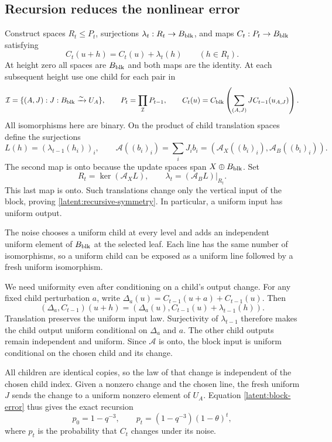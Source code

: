 \documentclass[11pt]{article}
\begin{document}
\subsection{Recursion reduces the nonlinear error}

Construct spaces $R_t\le P_t$, surjections $\lambda_t:R_t\to B_{\rm blk}$, and
maps $C_t:P_t\to B_{\rm blk}$ satisfying
\begin{equation}
 C_t(u+h)=C_t(u)+\lambda_t(h)\qquad(h\in R_t).
 \label{latent:recursive-symmetry}
\end{equation}
At height zero all spaces are $B_{\rm blk}$ and both maps are the identity.
At each subsequent height use one child for each pair in
\[
 \mathcal I=\{(A,J):J:B_{\rm blk}\xrightarrow{\sim}U_A\},
 \qquad
 P_t=\prod_{\mathcal I}P_{t-1},
 \qquad
 C_t(u)=C_{\rm blk}\left(\sum_{(A,J)}J C_{t-1}(u_{A,J})\right).
\]
All isomorphisms here are binary. On the product of child translation
spaces define the surjections
\[
 L(h)=(\lambda_{t-1}(h_i))_i,\qquad
 \mathcal A((b_i)_i)=\sum_iJ_i b_i
   =(\mathcal A_X((b_i)_i),\mathcal A_B((b_i)_i)).
\]
The second map is onto because the update spaces span $X\oplus B_{\rm blk}$.
Set
\[
 R_t=\ker(\mathcal A_XL),\qquad
 \lambda_t=(\mathcal A_BL)|_{R_t}.
\]
This last map is onto. Such translations change only the vertical
input of the block, proving \eqref{latent:recursive-symmetry}.
In particular, a uniform input has uniform output.

The noise chooses a uniform child at every level and adds an independent
uniform element of $B_{\rm blk}$ at the selected leaf. Each line has the same
number of isomorphisms, so a uniform child can be exposed as a uniform
line followed by a fresh uniform isomorphism.

We need uniformity even after conditioning on a child's output change.
For any fixed child perturbation $a$, write
$\Delta_a(u)=C_{t-1}(u+a)+C_{t-1}(u)$. Then
\[
 (\Delta_a,C_{t-1})(u+h)
 =(\Delta_a(u),C_{t-1}(u)+\lambda_{t-1}(h)).
\]
Translation preserves the uniform input law. Surjectivity of
$\lambda_{t-1}$ therefore makes the child output uniform conditional
on $\Delta_a$ and $a$. The other child outputs remain independent and
uniform. Since $\mathcal A$ is onto, the block input is uniform
conditional on the chosen child and its change.

All children are identical copies, so the law of that change is
independent of the chosen child index. Given a nonzero change and the
chosen line, the fresh uniform $J$ sends the change to a uniform
nonzero element of $U_A$. Equation \eqref{latent:block-error} thus
gives the exact recursion
\begin{equation}
 p_0=1-q^{-3},\qquad p_t=(1-q^{-3})(1-\theta)^t,
 \label{latent:recursive-error}
\end{equation}
where $p_t$ is the probability that $C_t$ changes under its noise.
\end{document}
